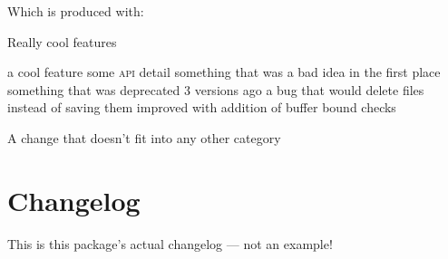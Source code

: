 \documentclass{ltxdoc}
\begin{document}
Which is produced with:

\begin{latexcode}
\usepackage[color]{changelog}
\begin{changelog}[author=Rebecca Turner,
	sectioncmd=\subsection,
	title=Example changelog]
\begin{version}
	\added Really cool features
\end{version}

\begin{version}[v=1.0.0, date=2018-10-26]
	\added a cool feature
	\changed some \textsc{api} detail
	\deprecated something that was a bad idea in the first place
	\removed something that was deprecated 3 versions ago
	\fixed a bug that would delete files instead of saving them
	\security improved with addition of buffer bound checks
	\item A change that doesn't fit into any other category
\end{version}
\end{changelog}
\end{latexcode}

\section{Changelog}

This is this package's actual changelog --- not an example!

\begin{changelog}[author=Rebecca Turner, section=false]
\end{changelog}
\end{document}
